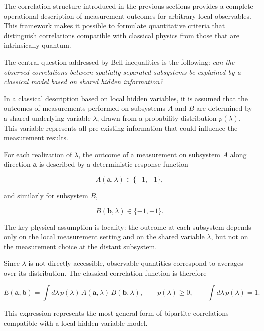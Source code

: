 The correlation structure introduced in the previous sections provides a complete operational description of measurement outcomes for arbitrary local observables. This framework makes it possible to formulate quantitative criteria that distinguish correlations compatible with classical physics from those that are intrinsically quantum.

\medskip

The central question addressed by Bell inequalities is the following: \emph{can the observed correlations between spatially separated subsystems be explained by a classical model based on shared hidden information?}

\medskip

In a classical description based on local hidden variables, it is assumed that the outcomes of measurements performed on subsystems \( A \) and \( B \) are determined by a shared underlying variable \( \lambda \), drawn from a probability distribution \( p(\lambda) \). This variable represents all pre-existing information that could influence the measurement results.

\medskip

For each realization of \( \lambda \), the outcome of a measurement on subsystem \( A \) along direction \( \mathbf{a} \) is described by a deterministic response function

\[
A(\mathbf{a},\lambda) \in \{-1,+1\},
\]

and similarly for subsystem \( B \),

\[
B(\mathbf{b},\lambda) \in \{-1,+1\}.
\]

\medskip

The key physical assumption is locality: the outcome at each subsystem depends only on the local measurement setting and on the shared variable \( \lambda \), but not on the measurement choice at the distant subsystem.

Since \( \lambda \) is not directly accessible, observable quantities correspond to averages over its distribution. The classical correlation function is therefore \cite{bell_epr_paradox_1964}

\begin{equation}
E(\mathbf{a},\mathbf{b})
=
\int d\lambda\,
p(\lambda)\,
A(\mathbf{a},\lambda)\,
B(\mathbf{b},\lambda),
\qquad
p(\lambda) \ge 0,
\qquad
\int d\lambda\,p(\lambda)=1.
\label{eq:local_hidden_variable_correlation}
\end{equation}

This expression represents the most general form of bipartite correlations compatible with a local hidden-variable model.

